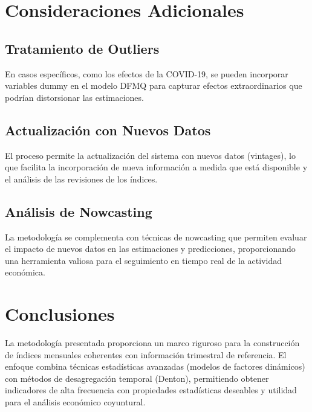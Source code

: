 \documentclass[12pt,a4paper]{article}
\begin{document}
\section{Consideraciones Adicionales}

\subsection{Tratamiento de Outliers}

En casos específicos, como los efectos de la COVID-19, se pueden incorporar variables dummy en el modelo DFMQ para capturar efectos extraordinarios que podrían distorsionar las estimaciones.

\subsection{Actualización con Nuevos Datos}

El proceso permite la actualización del sistema con nuevos datos (vintages), lo que facilita la incorporación de nueva información a medida que está disponible y el análisis de las revisiones de los índices.

\subsection{Análisis de Nowcasting}

La metodología se complementa con técnicas de nowcasting que permiten evaluar el impacto de nuevos datos en las estimaciones y predicciones, proporcionando una herramienta valiosa para el seguimiento en tiempo real de la actividad económica.

\section{Conclusiones}

La metodología presentada proporciona un marco riguroso para la construcción de índices mensuales coherentes con información trimestral de referencia. El enfoque combina técnicas estadísticas avanzadas (modelos de factores dinámicos) con métodos de desagregación temporal (Denton), permitiendo obtener indicadores de alta frecuencia con propiedades estadísticas deseables y utilidad para el análisis económico coyuntural.
\end{document}
